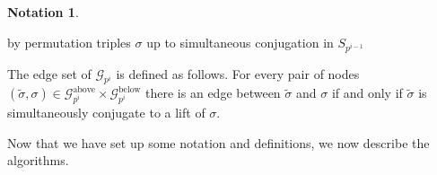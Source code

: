 \documentclass{dcthesis}
\newcommand{\PP}{\mathbb P}
\newcommand{\ZZ}{\mathbb Z}
\newcommand{\defi}[1]{\textsf{#1}}
\newcommand{\wt}[1]{\widetilde{#1}}
\numberwithin{equation}{section}
\newtheorem{lemma}[equation]{Lemma}
\theoremstyle{definition}
\newtheorem{definition}[equation]{Definition}
\newtheorem{notation}[equation]{Notation}
\theoremstyle{remark}
\begin{document}
{{\begin{notation}
\begin{itemize}
          by permutation triples $\sigma$
          up to simultaneous conjugation
          in $S_{p^{i-1}}$
      \end{itemize}
      The edge set of
      $\mathscr{G}_{p^i}$ is defined as follows.
      For every pair of nodes
      $(\wt{\sigma},\sigma)\in
      \mathscr{G}_{p^i}^\text{above}
      \times
      \mathscr{G}_{p^i}^\text{below}$
      there is an edge between
      $\wt{\sigma}$
      and $\sigma$
      if and only if
      $\wt{\sigma}$ is simultaneously conjugate
      to a lift of $\sigma$.
    \end{notation}
    Now that we have set up some notation
    and definitions,
    we now describe the algorithms.
}}
\end{document}

